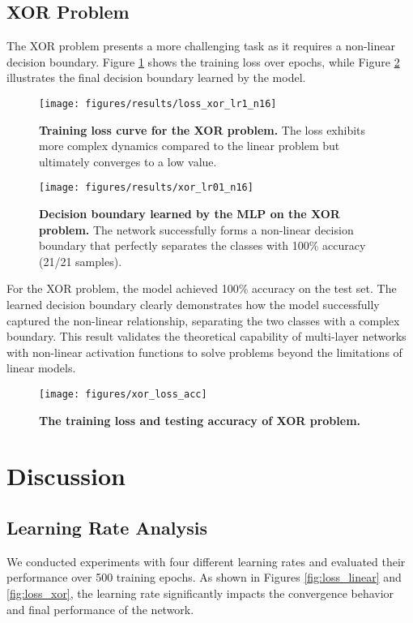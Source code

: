 \documentclass[twocolumn]{extarticle}
\begin{document}
\subsection{XOR Problem}
The XOR problem presents a more challenging task as it requires a non-linear decision boundary. Figure \ref{fig:xor_loss} shows the training loss over epochs, while Figure \ref{fig:xor_results} illustrates the final decision boundary learned by the model.

\begin{figure}[H]
\centering
\texttt{[image: figures/results/loss\_xor\_lr1\_n16]}
\caption{\textbf{Training loss curve for the XOR problem.} The loss exhibits more complex dynamics compared to the linear problem but ultimately converges to a low value.}
\label{fig:xor_loss}
\end{figure}

\begin{figure}[H]
\centering
\texttt{[image: figures/results/xor\_lr01\_n16]}
\caption{\textbf{Decision boundary learned by the MLP on the XOR problem.} The network successfully forms a non-linear decision boundary that perfectly separates the classes with 100\% accuracy (21/21 samples).}
\label{fig:xor_results}
\end{figure}

For the XOR problem, the model achieved 100\% accuracy on the test set. The learned decision boundary clearly demonstrates how the model successfully captured the non-linear relationship, separating the two classes with a complex boundary. This result validates the theoretical capability of multi-layer networks with non-linear activation functions to solve problems beyond the limitations of linear models.

\begin{figure}[H]
\centering
\texttt{[image: figures/xor\_loss\_acc]}
\caption{\textbf{The training loss and testing accuracy of XOR problem.}}
\label{fig:xorlossacc}
\end{figure}


\section{Discussion}

\subsection{Learning Rate Analysis}
We conducted experiments with four different learning rates and evaluated their performance over 500 training epochs. As shown in Figures \ref{fig:loss_linear} and \ref{fig:loss_xor}, the learning rate significantly impacts the convergence behavior and final performance of the network.
\end{document}
